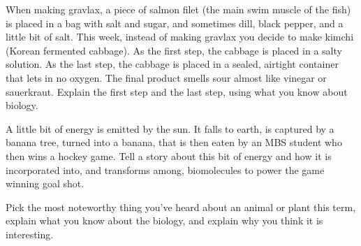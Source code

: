 \documentclass[exam,addpoints,answers]{exam}
\begin{document}
\begin{questions}
\clearpage
\question[23] When making gravlax, a piece of salmon filet (the main swim muscle of the fish) is placed in a bag with salt and sugar, and sometimes dill, black pepper, and a little bit of salt. This week, instead of making gravlax you decide to make kimchi (Korean fermented cabbage). As the first step, the cabbage is placed in a salty solution. As the last step, the cabbage is placed in a sealed, airtight container that lets in no oxygen. The final product smells sour almost like vinegar or sauerkraut. Explain the first step and the last step, using what you know about biology. 

\clearpage
\question[22] A little bit of energy is emitted by the sun. It falls to earth, is captured by a banana tree, turned into a banana, that is then eaten by an MBS student who then wins a hockey game. Tell a story about this bit of energy and how it is incorporated into, and transforms among, biomolecules to power the game winning goal shot. 

\clearpage
\question[23] Pick the most noteworthy thing you've heard about an animal or plant this term, explain what you know about the biology, and explain why you think it is interesting. 
\end{questions}
\end{document}
